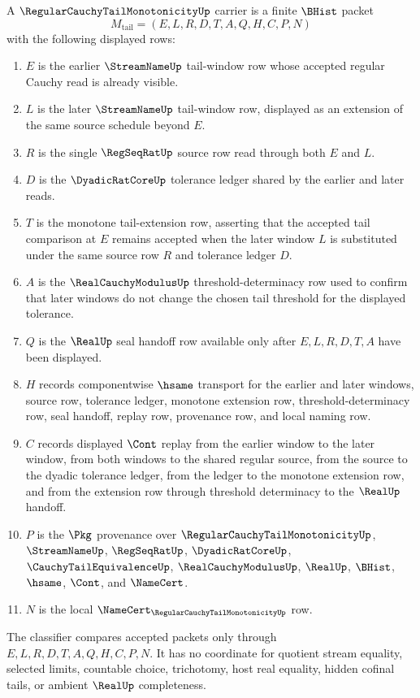 \begin{definition}
\label{def:regular-cauchy-tail-monotonicity-carrier}
A $\RegularCauchyTailMonotonicityUp$ carrier is a finite $\BHist$ packet
$$
M_{\mathrm{tail}}=(E,L,R,D,T,A,Q,H,C,P,N)
$$
with the following displayed rows:
\begin{enumerate}
\item $E$ is the earlier $\StreamNameUp$ tail-window row whose accepted regular Cauchy read is already visible.
\item $L$ is the later $\StreamNameUp$ tail-window row, displayed as an extension of the same source schedule beyond $E$.
\item $R$ is the single $\RegSeqRatUp$ source row read through both $E$ and $L$.
\item $D$ is the $\DyadicRatCoreUp$ tolerance ledger shared by the earlier and later reads.
\item $T$ is the monotone tail-extension row, asserting that the accepted tail comparison at $E$ remains accepted when the later window $L$ is substituted under the same source row $R$ and tolerance ledger $D$.
\item $A$ is the $\RealCauchyModulusUp$ threshold-determinacy row used to confirm that later windows do not change the chosen tail threshold for the displayed tolerance.
\item $Q$ is the $\RealUp$ seal handoff row available only after $E,L,R,D,T,A$ have been displayed.
\item $H$ records componentwise $\hsame$ transport for the earlier and later windows, source row, tolerance ledger, monotone extension row, threshold-determinacy row, seal handoff, replay row, provenance row, and local naming row.
\item $C$ records displayed $\Cont$ replay from the earlier window to the later window, from both windows to the shared regular source, from the source to the dyadic tolerance ledger, from the ledger to the monotone extension row, and from the extension row through threshold determinacy to the $\RealUp$ handoff.
\item $P$ is the $\Pkg$ provenance over $\RegularCauchyTailMonotonicityUp$, $\StreamNameUp$, $\RegSeqRatUp$, $\DyadicRatCoreUp$, $\CauchyTailEquivalenceUp$, $\RealCauchyModulusUp$, $\RealUp$, $\BHist$, $\hsame$, $\Cont$, and $\NameCert$.
\item $N$ is the local $\NameCert_{\RegularCauchyTailMonotonicityUp}$ row.
\end{enumerate}
The classifier compares accepted packets only through $E,L,R,D,T,A,Q,H,C,P,N$. It has no coordinate for quotient stream equality, selected limits, countable choice, trichotomy, host real equality, hidden cofinal tails, or ambient $\RealUp$ completeness.
\end{definition}

